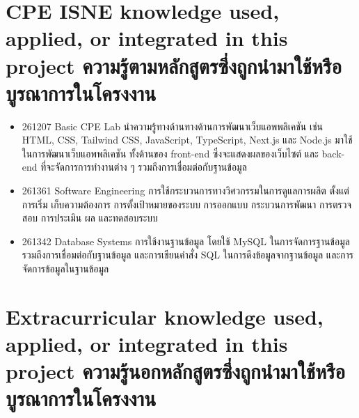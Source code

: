 \section{\ifenglish%
      \ifcpe CPE \else ISNE \fi knowledge used, applied, or integrated in this project
  \else%
      ความรู้ตามหลักสูตรซึ่งถูกนำมาใช้หรือบูรณาการในโครงงาน
  \fi
 }

\begin{itemize}
    \item 261207 Basic CPE Lab นําความรู้ทางด้านทางด้านการพัฒนาเว็บแอพพลิเคชัน เช่น HTML, CSS, Tailwind CSS, JavaScript, TypeScript, Next.js
          และ Node.js มาใช้ในการพัฒนาเว็บแอพพลิเคชัน ทั้งด้านของ front-end ซึ่งจะแสดงผลของเว็บไซต์ และ back-end ที่จะจัดการการทำงานต่าง ๆ รวมถึงการเชื่อมต่อกับฐานข้อมูล
    \item 261361 Software Engineering การใช้กระบวนการทางวิศวกรรมในการดูแลการผลิต ตั้งแต่การเริ่ม
          เก็บความต้องการ การตั้งเป้าหมายของระบบ การออกแบบ กระบวนการพัฒนา การตรวจสอบ การประเมิน
          ผล และทดสอบระบบ
    \item 261342 Database Systems การใช้งานฐานข้อมูล โดยใช้ MySQL ในการจัดการฐานข้อมูล รวมถึงการเชื่อมต่อกับฐานข้อมูล
            และการเขียนคำสั่ง SQL ในการดึงข้อมูลจากฐานข้อมูล และการจัดการข้อมูลในฐานข้อมูล 


\end{itemize}


\section{\ifenglish%
      Extracurricular knowledge used, applied, or integrated in this project
  \else%
      ความรู้นอกหลักสูตรซึ่งถูกนำมาใช้หรือบูรณาการในโครงงาน
  \fi
 }

